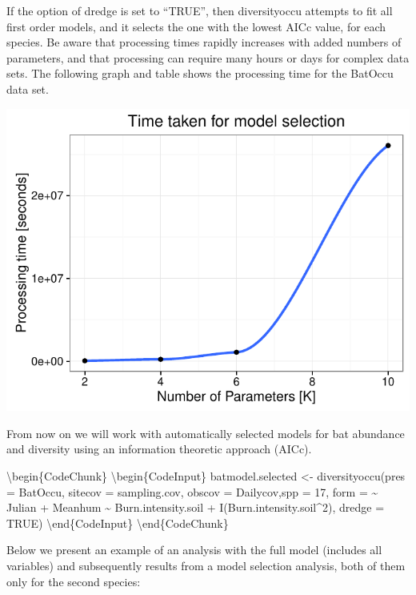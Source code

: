 \documentclass[article]{jss}
\begin{document}
If the option of dredge is set to ``TRUE'', then diversityoccu attempts
to fit all first order models, and it selects the one with the lowest
AICc value, for each species. Be aware that processing times rapidly
increases with added numbers of parameters, and that processing can
require many hours or days for complex data sets. The following graph
and table shows the processing time for the BatOccu data set.

\begin{CodeChunk}


\begin{center}\includegraphics{diversityocc_files/figure-latex/unnamed-chunk-13-1} \end{center}

\end{CodeChunk}

From now on we will work with automatically selected models for bat
abundance and diversity using an information theoretic approach (AICc).

\textbackslash{}begin\{CodeChunk\} \textbackslash{}begin\{CodeInput\}
batmodel.selected \textless{}- diversityoccu(pres = BatOccu, sitecov =
sampling.cov, obscov = Dailycov,spp = 17, form = \textasciitilde{}
Julian + Meanhum \textasciitilde{} Burn.intensity.soil +
I(Burn.intensity.soil\^{}2), dredge = TRUE)
\textbackslash{}end\{CodeInput\} \textbackslash{}end\{CodeChunk\}

Below we present an example of an analysis with the full model (includes
all variables) and subsequently results from a model selection analysis,
both of them only for the second species:
\end{document}
